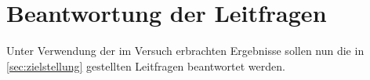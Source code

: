 \section{Beantwortung der Leitfragen}

Unter Verwendung der im Versuch erbrachten Ergebnisse sollen nun die in \cref{sec:zielstellung} gestellten Leitfragen beantwortet werden.






